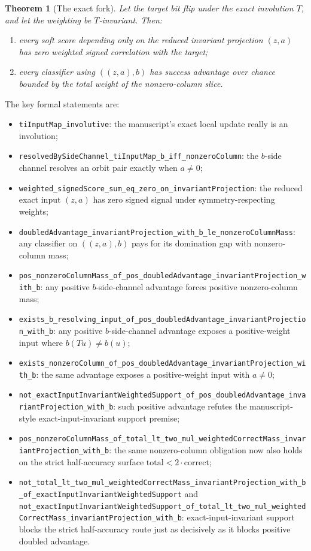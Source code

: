 \documentclass[11pt]{article}
\newtheorem{theorem}{Theorem}[section]
\theoremstyle{remark}
\begin{document}
\begin{theorem}[The exact fork]
Let the target bit flip under the exact involution \(T\), and let the weighting be \(T\)-invariant.
Then:
\begin{enumerate}[leftmargin=1.5em]
  \item every soft score depending only on the reduced invariant projection \((z,a)\) has zero
  weighted signed correlation with the target;
  \item every classifier using \(((z,a),b)\) has success advantage over chance bounded by the
  total weight of the nonzero-column slice.
\end{enumerate}
\end{theorem}

\noindent
The key formal statements are:
\begin{itemize}[leftmargin=1.5em]
  \item \texttt{tiInputMap\_involutive}: the manuscript's exact local update really is an
  involution;
  \item \texttt{resolvedBySideChannel\_tiInputMap\_b\_iff\_nonzeroColumn}: the \(b\)-side channel
  resolves an orbit pair exactly when \(a \neq 0\);
  \item \texttt{weighted\_signedScore\_sum\_eq\_zero\_on\_invariantProjection}: the reduced exact
  input \((z,a)\) has zero signed signal under symmetry-respecting weights;
  \item \texttt{doubledAdvantage\_invariantProjection\_with\_b\_le\_nonzeroColumnMass}: any
  classifier on \(((z,a),b)\) pays for its domination gap with nonzero-column mass;
  \item \texttt{pos\_nonzeroColumnMass\_of\_pos\_doubledAdvantage\_invariantProjection\_with\_b}:
  any positive \(b\)-side-channel advantage forces positive nonzero-column mass;
  \item \texttt{exists\_b\_resolving\_input\_of\_pos\_doubledAdvantage\_invariantProjection\_with\_b}:
  any positive \(b\)-side-channel advantage exposes a positive-weight input where
  \(b(Tu)\ne b(u)\);
  \item \texttt{exists\_nonzeroColumn\_of\_pos\_doubledAdvantage\_invariantProjection\_with\_b}:
  the same advantage exposes a positive-weight input with \(a\ne 0\);
  \item \texttt{not\_exactInputInvariantWeightedSupport\_of\_pos\_doubledAdvantage\_invariantProjection\_with\_b}:
  such positive advantage refutes the manuscript-style exact-input-invariant support premise;
  \item \texttt{pos\_nonzeroColumnMass\_of\_total\_lt\_two\_mul\_weightedCorrectMass\_invariantProjection\_with\_b}:
  the same nonzero-column obligation now also holds on the strict half-accuracy surface
  \(\mathrm{total}<2\cdot\mathrm{correct}\);
  \item \texttt{not\_total\_lt\_two\_mul\_weightedCorrectMass\_invariantProjection\_with\_b\_of\_exactInputInvariantWeightedSupport}
  and
  \texttt{not\_exactInputInvariantWeightedSupport\_of\_total\_lt\_two\_mul\_weightedCorrectMass\_invariantProjection\_with\_b}:
  exact-input-invariant support blocks the strict half-accuracy route just as decisively as it
  blocks positive doubled advantage.
\end{itemize}
\end{document}
